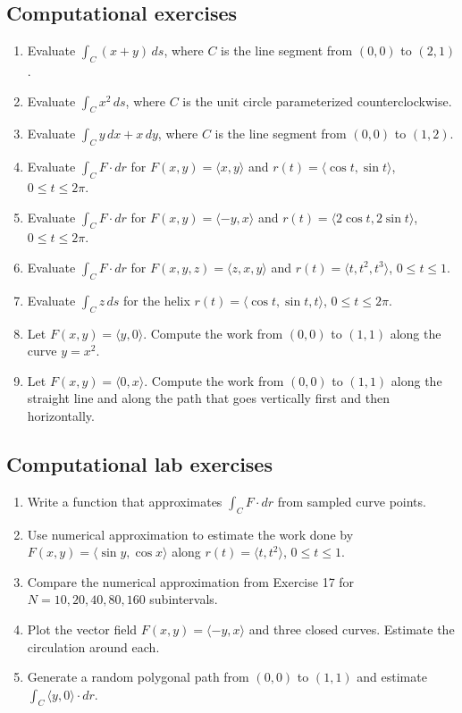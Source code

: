 \documentclass[11pt,oneside]{book}
\begin{document}
\subsection*{Computational exercises}
\begin{enumerate}[start=7]
  \item Evaluate $\int_C (x+y)\,ds$, where $C$ is the line segment from $(0,0)$ to $(2,1)$.
  \item Evaluate $\int_C x^2\,ds$, where $C$ is the unit circle parameterized counterclockwise.
  \item Evaluate $\int_C y\,dx+x\,dy$, where $C$ is the line segment from $(0,0)$ to $(1,2)$.
  \item Evaluate $\int_C F\cdot dr$ for $F(x,y)=\langle x,y\rangle$ and $r(t)=\langle \cos t,\sin t\rangle$, $0\le t\le 2\pi$.
  \item Evaluate $\int_C F\cdot dr$ for $F(x,y)=\langle -y,x\rangle$ and $r(t)=\langle 2\cos t,2\sin t\rangle$, $0\le t\le 2\pi$.
  \item Evaluate $\int_C F\cdot dr$ for $F(x,y,z)=\langle z,x,y\rangle$ and $r(t)=\langle t,t^2,t^3\rangle$, $0\le t\le 1$.
  \item Evaluate $\int_C z\,ds$ for the helix $r(t)=\langle \cos t,\sin t,t\rangle$, $0\le t\le 2\pi$.
  \item Let $F(x,y)=\langle y,0\rangle$. Compute the work from $(0,0)$ to $(1,1)$ along the curve $y=x^2$.
  \item Let $F(x,y)=\langle 0,x\rangle$. Compute the work from $(0,0)$ to $(1,1)$ along the straight line and along the path that goes vertically first and then horizontally.
\end{enumerate}

\subsection*{Computational lab exercises}
\begin{enumerate}[start=16]
  \item Write a function that approximates $\int_C F\cdot dr$ from sampled curve points.
  \item Use numerical approximation to estimate the work done by $F(x,y)=\langle \sin y,\cos x\rangle$ along $r(t)=\langle t,t^2\rangle$, $0\le t\le 1$.
  \item Compare the numerical approximation from Exercise 17 for $N=10,20,40,80,160$ subintervals.
  \item Plot the vector field $F(x,y)=\langle -y,x\rangle$ and three closed curves. Estimate the circulation around each.
  \item Generate a random polygonal path from $(0,0)$ to $(1,1)$ and estimate $\int_C \langle y,0\rangle\cdot dr$.
\end{enumerate}
\end{document}
